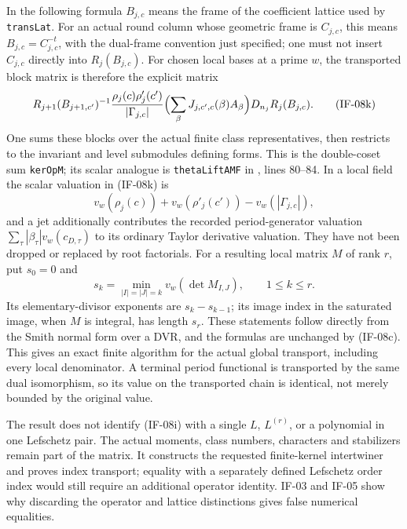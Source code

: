 \documentclass[11pt,a4paper]{article}
\theoremstyle{definition}
\theoremstyle{remark}
\begin{document}
In the following formula $B_{j,c}$ means the frame of the coefficient
lattice used by \texttt{transLat}. For an actual round column whose
geometric frame is $C_{j,c}$, this means $B_{j,c}=C_{j,c}^{-t}$,
with the dual-frame convention just specified; one must not insert
$C_{j,c}$ directly into $R_j(B_{j,c})$. For chosen local bases at a
prime $w$, the transported block matrix is therefore the explicit matrix
\[
 R_{j+1}(B_{j+1,c'})^{-1}
 \frac{\rho_j(c)\rho'_j(c')}{|\Gamma_{j,c}|}
 \Bigl(\sum_{\beta}J_{j,c',c}(\beta)A_{\beta}\Bigr)
 D_{n_j} R_j(B_{j,c}).                              \tag{IF-08k}
\]
One sums these blocks over the actual finite class representatives,
then restricts to the invariant and level submodules defining forms.
This is the double-coset sum \texttt{kerOpM}; its scalar analogue is
\texttt{thetaLiftAMF} in ,
lines 80--84. In a local field the scalar valuation in (IF-08k) is
\[
 v_w(\rho_j(c))+v_w(\rho'_j(c'))-v_w(|\Gamma_{j,c}|),
\]
and a jet additionally contributes the recorded period-generator
valuation $\sum_\tau |\beta_\tau|v_w(c_{D,\tau})$ to its ordinary
Taylor derivative valuation. They have not been dropped or replaced
by root factorials. For a resulting local matrix $M$ of rank $r$,
put $s_0=0$ and
\[
 s_k=\min_{|I|=|J|=k}v_w(\det M_{I,J}),\qquad 1\leq k\leq r.
\]
Its elementary-divisor exponents are $s_k-s_{k-1}$; its image index
in the saturated image, when $M$ is integral, has length $s_r$.
These statements follow directly from the Smith normal form over a
DVR, and the formulas are unchanged by (IF-08c). This gives an exact
finite algorithm for the actual global transport, including every
local denominator. A terminal period functional is transported by
the same dual isomorphism, so its value on the transported chain is
identical, not merely bounded by the original value.

The result does not identify (IF-08i) with a single $L$, $L^{(r)}$,
or a polynomial in one Lefschetz pair. The actual moments,
class numbers, characters and stabilizers remain part of the matrix.
It constructs the requested finite-kernel intertwiner and proves
index transport; equality with a separately defined Lefschetz order
index would still require an additional operator identity. IF-03 and
IF-05 show why discarding the operator and lattice distinctions gives
false numerical equalities.
\end{document}
